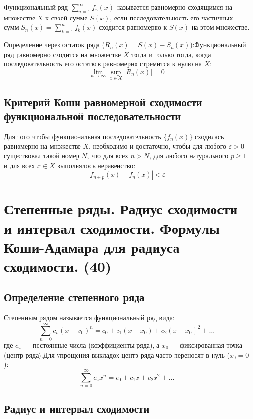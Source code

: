 \documentclass[14pt]{extreport}
\begin{document}
    \begin{definition}
        Функциональный ряд $\sum_{n=1}^{\infty} f_n(x)$ называется равномерно сходящимся на множестве $X$ к своей сумме $S(x)$, если последовательность его частичных сумм $S_n(x) = \sum_{k=1}^n f_k(x)$ сходится равномерно к $S(x)$ на этом множестве.
    \end{definition}


    Определение через остаток ряда ($R_n(x) = S(x) - S_n(x)$):Функциональный ряд равномерно сходится на множестве $X$ тогда и только тогда, когда последовательность его остатков равномерно стремится к нулю на $X$:$$\lim_{n \to \infty} \sup_{x \in X} |R_n(x)| = 0$$

    \section{Критерий Коши равномерной сходимости функциональной последовательности}
    Для того чтобы функциональная последовательность $\{f_n(x)\}$ сходилась равномерно на множестве $X$, необходимо и достаточно, чтобы для любого $\varepsilon > 0$ существовал такой номер $N$, что для всех $n > N$, для любого натурального $p \ge 1$ и для всех $x \in X$ выполнялось неравенство:$$|f_{n+p}(x) - f_n(x)| < \varepsilon$$


    \chapter{Степенные ряды. Радиус сходимости и интервал сходимости. Формулы Коши-Адамара
для радиуса сходимости. (40)}
    \section{Определение степенного ряда}
    \begin{definition}
        Степенным рядом называется функциональный ряд вида:$$\sum_{n=0}^{\infty} c_n (x - x_0)^n = c_0 + c_1(x - x_0) + c_2(x - x_0)^2 + \dots$$где $c_n$ — постоянные числа (коэффициенты ряда), а $x_0$ — фиксированная точка (центр ряда).Для упрощения выкладок центр ряда часто переносят в нуль ($x_0 = 0$):$$\sum_{n=0}^{\infty} c_n x^n = c_0 + c_1 x + c_2 x^2 + \dots$$
    \end{definition}

    \section{Радиус и интервал сходимости}
\end{document}
